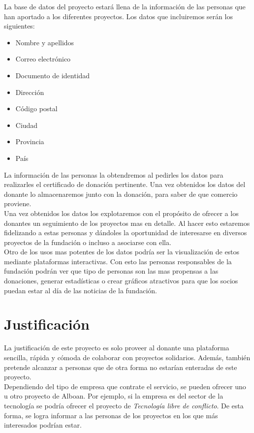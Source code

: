 \documentclass[paper=a4, fontsize=12pt]{scrartcl} %
\numberwithin{equation}{section} %
\numberwithin{figure}{section} %
\numberwithin{table}{section} %
\begin{document}
La base de datos del proyecto estará llena de la información de las personas que han aportado a los diferentes proyectos. Los datos que incluiremos serán los siguientes:
\begin{multicols}{2}
	\begin{itemize}
		\item Nombre y apellidos
		\item Correo electrónico
		\item Documento de identidad
		\item Dirección 
		\item Código postal
		\item Ciudad
		\item Provincia
		\item País
	\end{itemize}
\end{multicols}
La información de las personas la obtendremos al pedirles los datos para realizarles el certificado de donación pertinente. Una vez obtenidos los datos del donante lo almacenaremos junto con la donación, para saber de que comercio proviene.\\

Una vez obtenidos los datos los explotaremos con el propósito de ofrecer a los donantes un seguimiento de los proyectos mas en detalle. Al hacer esto estaremos fidelizando a estas personas y dándoles la oportunidad de interesarse en diversos proyectos de la fundación o incluso a asociarse con ella.\\

Otro de los usos mas potentes de los datos podría ser la visualización de estos mediante plataformas interactivas. Con esto las personas responsables de la fundación podrán ver que tipo de personas son las mas propensas a las donaciones, generar estadísticas o crear gráficos atractivos para que los socios puedan estar al día de las noticias de la fundación.

\section{Justificación}
La justificación de este proyecto es solo proveer al donante una plataforma sencilla, rápida y cómoda de colaborar con proyectos solidarios. Además, también pretende alcanzar a personas que de otra forma no estarían enteradas de este proyecto. \\
Dependiendo del tipo de empresa que contrate el servicio, se pueden ofrecer uno u otro proyecto de Alboan. Por ejemplo, si la empresa es del sector de la tecnología se podría ofrecer el proyecto de \textit{Tecnología libre de conflicto}. De esta forma, se logra informar a las personas de los proyectos en los que más interesados podrían estar.
\end{document}
